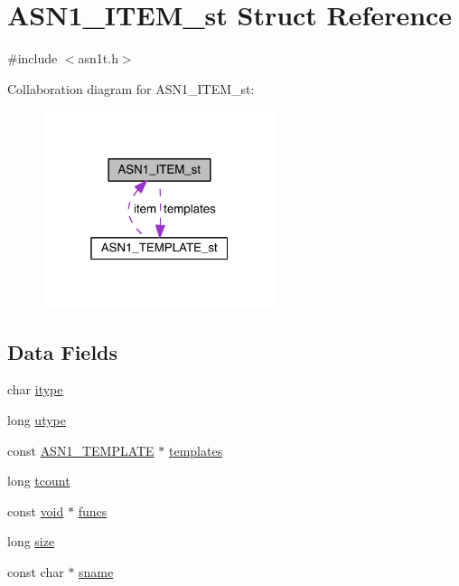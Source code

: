 \hypertarget{struct_a_s_n1___i_t_e_m__st}{}\section{A\+S\+N1\+\_\+\+I\+T\+E\+M\+\_\+st Struct Reference}
\label{struct_a_s_n1___i_t_e_m__st}


{\ttfamily \#include $<$asn1t.\+h$>$}



Collaboration diagram for A\+S\+N1\+\_\+\+I\+T\+E\+M\+\_\+st\+:\nopagebreak
\begin{figure}[H]
\begin{center}
\leavevmode
\includegraphics[width=193pt]{struct_a_s_n1___i_t_e_m__st__coll__graph}
\end{center}
\end{figure}
\subsection*{Data Fields}
\begin{DoxyCompactItemize}
\item 
char \hyperlink{struct_a_s_n1___i_t_e_m__st_af4501dc167020ccee24a341f21724862}{itype}
\item 
long \hyperlink{struct_a_s_n1___i_t_e_m__st_aacbed54996b0472b3e5933aa1f9aabc0}{utype}
\item 
const \hyperlink{crypto_2asn1_2asn1_8h_a6c952ee1ae445fda1ca8e1761bbd93ac}{A\+S\+N1\+\_\+\+T\+E\+M\+P\+L\+A\+TE} $\ast$ \hyperlink{struct_a_s_n1___i_t_e_m__st_a87113c724127f76609596e13d438d4aa}{templates}
\item 
long \hyperlink{struct_a_s_n1___i_t_e_m__st_addaa9bceee14e996e59e6fd2b836286f}{tcount}
\item 
const \hyperlink{hw__4758__cca_8h_afad4d591c7931ff6dc5bf69c76c96aa0}{void} $\ast$ \hyperlink{struct_a_s_n1___i_t_e_m__st_a6b8ab4163543eac278e7d0b65885249b}{funcs}
\item 
long \hyperlink{struct_a_s_n1___i_t_e_m__st_a37363161b41c4165b98cba7abc7a9d95}{size}
\item 
const char $\ast$ \hyperlink{struct_a_s_n1___i_t_e_m__st_a4b80c486312c118a491cc0d75a52d6e0}{sname}
\end{DoxyCompactItemize}


